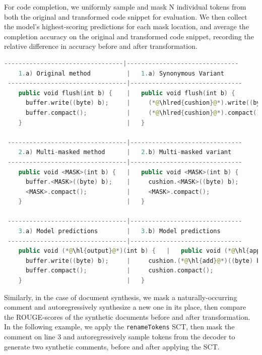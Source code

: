 \documentclass{article} %
\DeclareRobustCommand{\hlred}[1]{{\sethlcolor{pink}\hl{#1}}}
\begin{document}
\pagebreak

For code completion, we uniformly sample and mask N individual tokens from both the original and transformed code snippet for evaluation. We then collect the model's highest-scoring predictions for each mask location, and average the completion accuracy on the original and transformed code snippet, recording the relative difference in accuracy before and after transformation.

\begin{lstlisting}[basicstyle=\scriptsize\ttfamily, language=kotlin,label={lst:example2}]
 ---------------------------------|-------------------------------
    1.a) Original method          |   1.a) Synonymous Variant
 ---------------------------------|-------------------------------
    public void flush(int b) {    |   public void flush(int b) {
      buffer.write((byte) b);     |     (*@\hlred{cushion}@*).write((byte) b);
      buffer.compact();           |     (*@\hlred{cushion}@*).compact();
    }                             |   }

 ---------------------------------|-------------------------------
    2.a) Multi-masked method      |   2.b) Multi-masked variant
 ---------------------------------|-------------------------------
    public void <MASK>(int b) {   |   public void <MASK>(int b) {
      buffer.<MASK>((byte) b);    |     cushion.<MASK>((byte) b);
      <MASK>.compact();           |     <MASK>.compact();
    }                             |   }

 ---------------------------------|-------------------------------
    3.a) Model predictions        |   3.b) Model predictions
 ---------------------------------|-------------------------------
    public void (*@\hl{output}@*)(int b) {   |   public void (*@\hl{append}@*)(int b) {
      buffer.write((byte) b);     |     cushion.(*@\hl{add}@*)((byte) b);
      buffer.compact();           |     cushion.compact();
    }                             |   }
\end{lstlisting}


Similarly, in the case of document synthesis, we mask a naturally-occurring comment and autoregressively synthesize a new one in its place, then compare the ROUGE-scores of the synthetic documents before and after transformation. In the following example, we apply the \lstinline|renameTokens| SCT, then mask the comment on line 3 and autoregressively sample tokens from the decoder to generate two synthetic comments, before and after applying the SCT.
\end{document}
